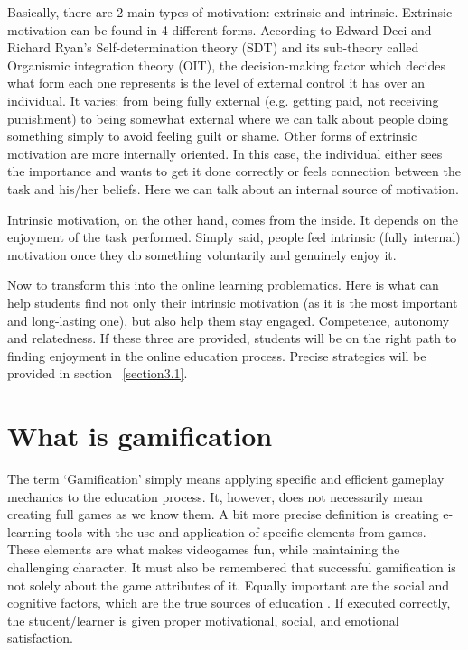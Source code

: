 \documentclass[10pt,english,a4paper]{article}
\begin{document}
	Basically, there are 2 main types of motivation: extrinsic and intrinsic. Extrinsic motivation can be found in 4 different forms. 
	According to Edward Deci and Richard Ryan's Self-determination theory (SDT) and its sub-theory called Organismic integration theory (OIT), the decision-making factor which decides what form each one represents is the level of external control it has over an individual. 
	It varies: from being fully external (e.g. getting paid, not receiving punishment) to being somewhat external where we can talk about people doing something simply to avoid feeling guilt or shame. Other forms of extrinsic motivation are more internally oriented. 
	In this case, the individual either sees the importance and wants to get it done correctly or feels connection between the task and his/her beliefs. Here we can talk about an internal source of motivation.
	
	Intrinsic motivation, on the other hand, comes from the inside. It depends on the enjoyment of the task performed. Simply said, people feel intrinsic (fully internal) motivation once they do something voluntarily and genuinely enjoy it.

	Now to transform this into the online learning problematics. Here is what can help students find not only their intrinsic motivation (as it is the most important and long-lasting one), but also help them stay engaged. 
	Competence, autonomy and relatedness. If these three are provided, students will be on the right path to finding enjoyment in the online education process\cite{Guyan}. Precise strategies will be provided in section ~\ref{section3.1}.

\section{What is gamification} \label{section3}
	The term ‘Gamification’ simply means applying specific and efficient gameplay mechanics to the education process. It, however, does not necessarily mean creating full games as we know them\cite{Raymer}.
	A bit more precise definition is creating e-learning tools with the use and application of specific elements from games. These elements are what makes videogames fun, while maintaining the challenging character\cite{Abu-Dawood}. 
	It must also be remembered that successful gamification is not solely about the game attributes of it. Equally important are the social and cognitive factors, which are the true sources of education \cite{Raymer}.
	If executed correctly, the student/learner is given proper motivational, social, and emotional satisfaction\cite{Abu-Dawood}.
\end{document}
